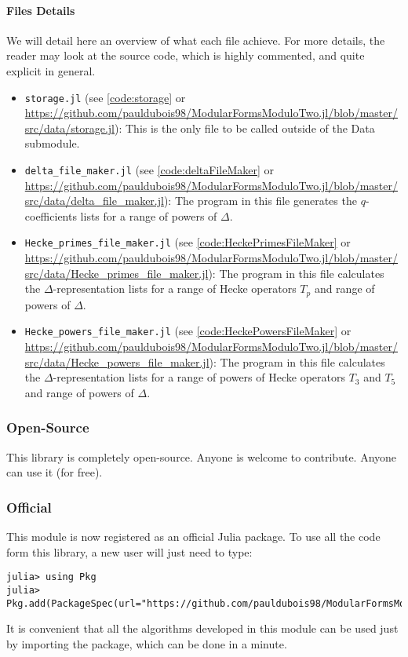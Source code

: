 \paragraph{Files Details}
We will detail here an overview of what each file achieve.
For more details, the reader may look at the source code, which is highly commented, and quite explicit in general.
\begin{itemize}
	\item \texttt{storage.jl} (see \ref{code:storage} or \url{https://github.com/pauldubois98/ModularFormsModuloTwo.jl/blob/master/src/data/storage.jl}): This is the only file to be called outside of the Data submodule.
	\item \texttt{delta\_file\_maker.jl} (see \ref{code:deltaFileMaker} or \url{https://github.com/pauldubois98/ModularFormsModuloTwo.jl/blob/master/src/data/delta_file_maker.jl}): The program in this file generates the $q$-coefficients lists for a range of powers of $\Delta$.
	\item \texttt{Hecke\_primes\_file\_maker.jl} (see \ref{code:HeckePrimesFileMaker} or \url{https://github.com/pauldubois98/ModularFormsModuloTwo.jl/blob/master/src/data/Hecke_primes_file_maker.jl}): The program in this file calculates the $\Delta$-representation lists for a range of Hecke operators $T_p$ and range of powers of $\Delta$.
	\item \texttt{Hecke\_powers\_file\_maker.jl} (see \ref{code:HeckePowersFileMaker} or \url{https://github.com/pauldubois98/ModularFormsModuloTwo.jl/blob/master/src/data/Hecke_powers_file_maker.jl}): The program in this file calculates the $\Delta$-representation lists for a range of powers of Hecke operators $T_3$ and $T_5$ and range of powers of $\Delta$.
\end{itemize}



\subsubsection{Open-Source}
This library is completely open-source.
Anyone is welcome to contribute.
Anyone can use it (for free).

\subsubsection{Official}
This module is now registered as an official Julia package.
To use all the code form this library, a new user will just need to type:
\begin{verbatim}
julia> using Pkg
julia> Pkg.add(PackageSpec(url="https://github.com/pauldubois98/ModularFormsModuloTwo.jl"))
\end{verbatim}
It is convenient that all the algorithms developed in this module can be used just by importing the package, which can be done in a minute.

